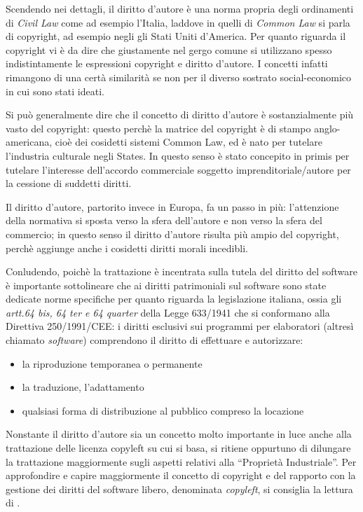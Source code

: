 Scendendo nei dettagli, il diritto d'autore è una norma propria degli ordinamenti di \textit{Civil Law} come ad esempio l'Italia, laddove in quelli di \textit{Common Law} si parla di copyright, ad esempio negli gli Stati Uniti d'America.
Per quanto riguarda il copyright vi è da dire che giustamente nel gergo comune si utilizzano spesso indistintamente le espressioni copyright e diritto d’autore. I concetti infatti rimangono di una certà similarità se non per il diverso  sostrato social-economico in cui sono stati ideati.

Si può generalmente dire che il concetto di diritto d’autore è sostanzialmente più vasto del copyright: questo perchè
la matrice del copyright è di stampo anglo-americana, cioè dei cosidetti sistemi Common Law, ed è nato per tutelare l’industria culturale negli States. In questo senso è stato concepito in primis per tutelare l’interesse dell'accordo commerciale soggetto imprenditoriale/autore per la cessione di suddetti diritti.

Il diritto d’autore, partorito invece in Europa, fa un passo in più: l’attenzione della normativa si sposta verso la sfera dell’autore e non verso la sfera del commercio; in questo senso il diritto d’autore risulta più ampio del copyright, perchè aggiunge anche i cosidetti diritti morali incedibli.

Conludendo, poichè la trattazione è incentrata sulla tutela del diritto del software è importante sottolineare che ai diritti patrimoniali sul software sono state dedicate norme specifiche per quanto riguarda la legislazione italiana, ossia gli \textit{artt.64 bis, 64 ter e 64 quarter} della Legge 633/1941 che si conformano alla Direttiva 250/1991/CEE: i diritti esclusivi sui programmi per elaboratori (altresì chiamato \textit{software}) comprendono il diritto di effettuare e autorizzare:

\begin{itemize}
\item la riproduzione temporanea o permanente
\item la traduzione, l’adattamento
\item qualsiasi forma di distribuzione al pubblico compreso la locazione
\end{itemize}

Nonstante il diritto d'autore sia un concetto molto importante in luce anche alla trattazione delle licenza copyleft su cui si basa, si ritiene oppurtuno di dilungare la trattazione maggiormente sugli aspetti relativi alla ``Proprietà Industriale''. Per approfondire e capire maggiormente il concetto di copyright e del rapporto con la gestione dei diritti del software libero, denominata \textit{copyleft}, si consiglia la lettura di \cite[Simone Aliprandi - Teoria e Pratica del copyleft]{Aliprandi-copyleft2}.

